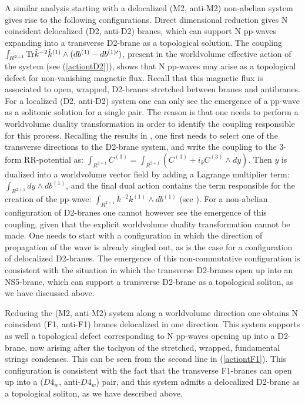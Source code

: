 \documentclass[12pt,a4paper]{article}
\begin{document}
A similar analysis starting with a delocalized (M2, anti-M2) 
non-abelian system 
gives rise to the following configurations. Direct dimensional reduction
gives N coincident delocalized (D2, anti-D2) branes, which can support N
pp-waves expanding into a transverse D2-brane as a topological solution.
The coupling 
$\int_{R^{2+1}}{\rm Tr}{\hat k}^{-2}{\hat k}^{(1)}
\wedge (db^{(1)}-db^{(1)\prime})$, present in the worldvolume effective
action of the system (see (\ref{actiontD2})),
shows that N pp-waves may arise as a topological defect for
non-vanishing magnetic flux. Recall that this magnetic flux
is associated to open, wrapped, D2-branes stretched between
branes and antibranes. For a localized (D2, anti-D2) system one can
only see the emergence of a pp-wave as a solitonic solution
for a single pair. The reason is that one needs to perform a
worldvolume duality transformation in order to identify the
coupling responsible for this process. Recalling the results in
\cite{HL1}, one first needs to select one of the transverse
directions to the D2-brane system, and write the coupling to the
3-form RR-potential as:
$\int_{R^{2+1}}C^{(3)}=\int_{R^{2+1}}(C^{(3)}+i_k C^{(3)}\wedge dy)$.
Then $y$ is dualized into a 
worldvolume vector field by adding a Lagrange multiplier term:
$\int_{R^{2+1}}dy\wedge db^{(1)}$, and the final dual action contains
the term responsible for the creation of the pp-wave:
$\int_{R^{2+1}}k^{-2}k^{(1)}\wedge db^{(1)}$ (see \cite{HL1}).
For a non-abelian configuration of D2-branes one cannot however
see the emergence of this coupling, given that the explicit
worldvolume duality transformation cannot be made. One needs to
start with a configuration in which the direction of propagation
of the wave is already singled out, as is the case for
a configuration of delocalized D2-branes.
The emergence of this non-commutative configuration
is consistent with the situation in which the transverse D2-branes
open up into an NS5-brane, which can support a transverse D2-brane as a 
topological soliton, as we have discussed above. 

Reducing the (M2, anti-M2) system along a 
worldvolume direction one obtains N coincident (F1, anti-F1) branes
delocalized in one direction.
This system supports as well a topological defect corresponding to
N pp-waves opening up into a D2-brane, 
now arising after the tachyon of the 
stretched, wrapped, fundamental strings condenses. 
This can be seen from the second line in (\ref{actiontF1}).
This configuration is
consistent with the fact that the transverse F1-branes
can open up into a ($D4_w$, anti-$D4_w$) pair, and this system 
admits a delocalized D2-brane as a topological soliton, as we
have described above.
\end{document}
